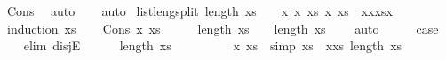 \begin{isabellebody}
\ Cons\ \isamarkupfalse%
\ auto\isanewline
\ \ \isamarkupfalse%
\isanewline
{}\isamarkupfalse%
\ auto%
\endisatagproof
{\isafoldproof}%
%
\isadelimproof
\isanewline
%
\endisadelimproof
\isanewline
{}\isamarkupfalse%
\ list{\isacharunderscore}{\kern0pt}len{\isacharunderscore}{\kern0pt}g{\isacharunderscore}{\kern0pt}{}{\isacharunderscore}{\kern0pt}split{\isacharcolon}{\kern0pt}\ {\isachardoublequoteopen}length\ xs\ {\isachargreater}{\kern0pt}\ {}\ {\isasymLongrightarrow}\ {\isasymexists}x\ x\ xs{\isacharprime}{\kern0pt}\ x\ xs\ {\isacharequal}{\kern0pt}\ xxxs{\isacharprime}{\kern0pt}{\isacharat}{\kern0pt}{\isacharbrackleft}{\kern0pt}x\isanewline
%
\isadelimproof
%
\endisadelimproof
%
\isatagproof
{}\isamarkupfalse%
\ {\isacharparenleft}{\kern0pt}induction\ xs{\isacharparenright}{\kern0pt}\isanewline
\ \ \isamarkupfalse%
\ {\isacharparenleft}{\kern0pt}Cons\ x\ xs{\isacharparenright}{\kern0pt}\isanewline
\ \ \isamarkupfalse%
\ \isamarkupfalse%
\ {\isachardoublequoteopen}length\ xs\ {\isacharequal}{\kern0pt}\ {}\ {\isasymor}\ length\ xs\ {\isachargreater}{\kern0pt}\ {}{\isachardoublequoteclose}\ \isamarkupfalse%
\ auto\isanewline
\ \ \isamarkupfalse%
\ \isamarkupfalse%
\ {\isacharquery}{\kern0pt}case\ \isanewline
\ \ \isamarkupfalse%
\ {\isacharparenleft}{\kern0pt}elim\ disjE{\isacharparenright}{\kern0pt}\isanewline
\ \ \ \ \isamarkupfalse%
\ {\isachardoublequoteopen}length\ xs\ {\isacharequal}{\kern0pt}\ {}{\isachardoublequoteclose}\isanewline
\ \ \ \ \isamarkupfalse%
\ \isamarkupfalse%
\ x\ xs\ \ {\isacharbrackleft}{\kern0pt}simp{\isacharbrackright}{\kern0pt}{\isacharcolon}{\kern0pt}\ {\isachardoublequoteopen}xs\ {\isacharequal}{\kern0pt}\ xxs\ {\isachardoublequoteopen}length\ xs\ {\isacharequal}{\kern0pt}\ {}{\isachardoublequoteclose}\isanewline
\ \ \ \ \ \ \isamarkupfalse%

\end{isabellebody}
